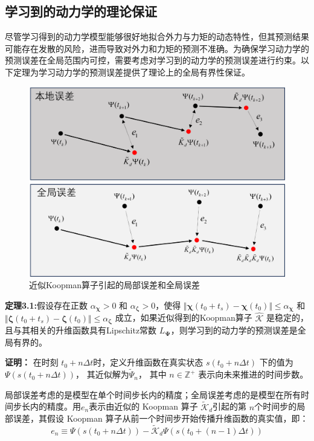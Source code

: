 \documentclass[lang=chs, degree=master, blindreview=false, winfonts=true]{yanputhesis}
\begin{document}
\subsection{学习到的动力学的理论保证}
尽管学习得到的动力学模型能够很好地拟合外力与力矩的动态特性，但其预测结果可能存在发散的风险，进而导致对外力和力矩的预测不准确。为确保学习动力学的预测误差在全局范围内可控，需要考虑对学习到的动力学的预测误差进行约束。以下定理为学习动力学的预测误差提供了理论上的全局有界性保证。
\begin{figure}[hbt!]
	\centering
	\includegraphics[width=32pc]{picture/3_2.png} 
	\caption{近似Koopman算子引起的局部误差和全局误差} \label{3_2}
\end{figure}

\textbf{定理3.1:}假设存在正数 $\alpha_{\bm{\chi}}>0$ 和 $\alpha_{\bm{\zeta}}>0$，使得 $\Vert \bm{\chi}(t_0+t_s)-\bm{\chi}(t_0)\Vert \le \alpha_{\bm{\chi}}$ 和 $\Vert \bm{\zeta}(t_0+t_s) - \bm{\zeta}(t_0) \Vert \le \alpha_{\bm{\zeta}}$ 成立，如果近似得到的Koopman算子 $\hat{{\mathcal{K}}}$ 是稳定的，且与其相关的升维函数具有Lipschitz常数 $L_{\bm{\Psi}}$，则学习到的动力学的预测误差是全局有界的。

\textbf{证明：}
在时刻 \( t_0 + n\Delta t \)时，定义升维函数在真实状态 \( s(t_0 + n\Delta t) \) 下的值为 
$
\Psi(s(t_0 + n\Delta t))$，
其近似解为$
\tilde{\Psi}_n
$，
其中 $ n \in \mathbb{Z}^+ $ 表示向未来推进的时间步数。

局部误差考虑的是模型在单个时间步长内的精度；全局误差考虑的是模型在所有时间步长内的精度。用$e_n$表示由近似的 Koopman 算子 \( \tilde{\mathcal{K}}_d \)引起的第 
\( n \)个时间步的局部误差，其假设 Koopman 算子从前一个时间步开始传播升维函数的真实值，即：
\begin{equation}
	e_n\equiv\Psi(s(t_0+n\Delta t))-\tilde{\mathcal{K}}_d\Psi(s(t_0+(n-1)\Delta t))
	\label{k}
\end{equation}
\end{document}
